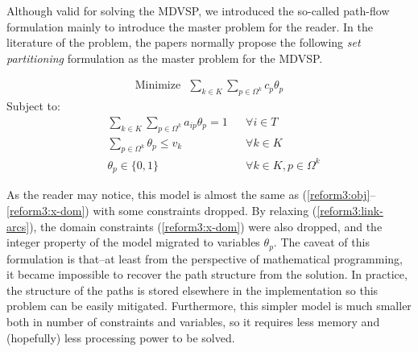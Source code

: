 \documentclass{article}
\begin{document}
Although valid for solving the MDVSP, we introduced the so-called path-flow formulation mainly to introduce the master problem for the reader. In the literature of the problem, the papers normally propose the following \textit{set partitioning} formulation as the master problem for the MDVSP.

\noindent
\begin{minipage}{\linewidth}
\begin{align}
   \mathrm{Minimize~~~} \sum_{k \in K} \sum_{p \in \Omega^k} c_p \theta_p \label{model:sp:obj}
\end{align}
\qquad Subject to:
\begin{align}
   & \sum_{k \in K} \sum_{p \in \Omega^k} a_{ip} \theta_p = 1 & & \forall i \in T \label{model:sp:assignment}\\
   & \sum_{p \in \Omega^k}  \theta_p \leqslant v_k & & \forall k \in K \label{model:sp:depot-cap}\\
   & \theta_p \in \{0, 1\} & & \forall k \in K, p \in \Omega^k \label{model:sp:domain}
\end{align}
\end{minipage}

\vspace{12pt}

As the reader may notice, this model is almost the same as (\ref{reform3:obj}--\ref{reform3:x-dom}) with some constraints dropped. By relaxing (\ref{reform3:link-arcs}), the domain constraints (\ref{reform3:x-dom}) were also dropped, and the integer property of the model migrated to variables $\theta_p$. The caveat of this formulation is that--at least from the perspective of mathematical programming, it became impossible to recover the path structure from the solution. In practice, the structure of the paths is stored elsewhere in the implementation so this problem can be easily mitigated. Furthermore, this simpler model is much smaller both in number of constraints and variables, so it requires less memory and (hopefully) less processing power to be solved.
\end{document}
